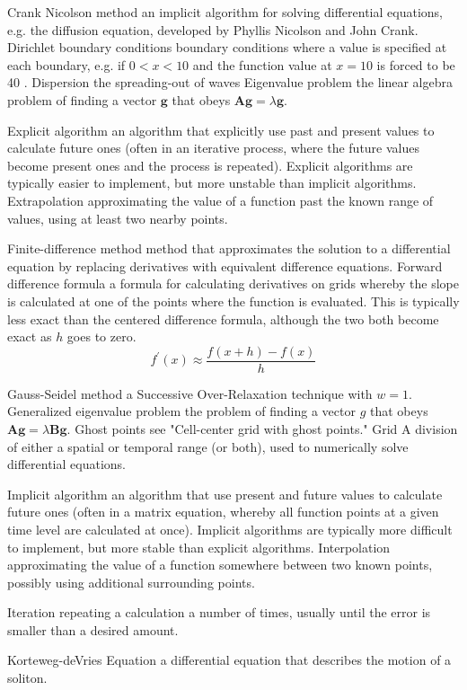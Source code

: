 Crank Nicolson method an implicit algorithm for solving differential equations, e.g. the diffusion equation, developed by Phyllis Nicolson and John Crank.
Dirichlet boundary conditions boundary conditions where a value is specified at each boundary, e.g. if $0<x<10$ and the function value at $x=10$ is forced to be 40 .
Dispersion the spreading-out of waves
Eigenvalue problem the linear algebra problem of finding a vector $\mathbf{g}$ that obeys $\mathbf{A g}=\lambda \mathbf{g}$.

Explicit algorithm an algorithm that explicitly use past and present values to calculate future ones (often in an iterative process, where the future values become present ones and the process is repeated). Explicit algorithms are typically easier to implement, but more unstable than implicit algorithms.
Extrapolation approximating the value of a function past the known range of values, using at least two nearby points.

Finite-difference method method that approximates the solution to a differential equation by replacing derivatives with equivalent difference equations.
Forward difference formula a formula for calculating derivatives on grids whereby the slope is calculated at one of the points where the function is evaluated. This is typically less exact than the centered difference formula, although the two both become exact as $h$ goes to zero.
$$
f^{\prime}(x) \approx \frac{f(x+h)-f(x)}{h}
$$

Gauss-Seidel method a Successive Over-Relaxation technique with $w=1$.
Generalized eigenvalue problem the problem of finding a vector $g$ that obeys $\mathbf{A g}=\lambda \mathbf{B g} .$
Ghost points see "Cell-center grid with ghost points."
Grid A division of either a spatial or temporal range (or both), used to numerically solve differential equations.

Implicit algorithm an algorithm that use present and future values to calculate future ones (often in a matrix equation, whereby all function points at a given time level are calculated at once). Implicit algorithms are typically more difficult to implement, but more stable than explicit algorithms.
Interpolation approximating the value of a function somewhere between two known points, possibly using additional surrounding points.

Iteration repeating a calculation a number of times, usually until the error is smaller than a desired amount.

Korteweg-deVries Equation a differential equation that describes the motion of a soliton.

